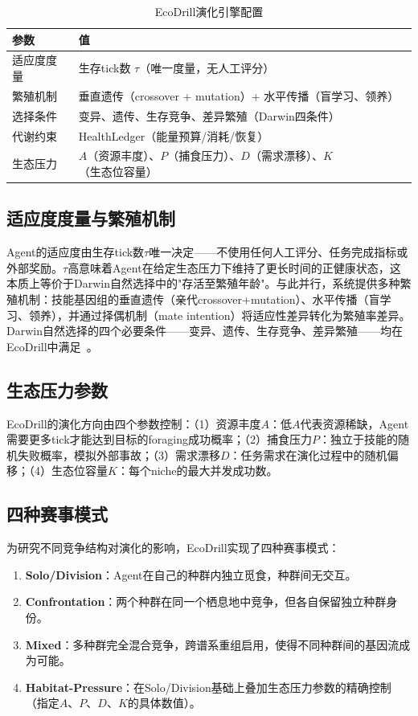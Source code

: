 \documentclass[12pt,a4paper]{ctexart}
\begin{document}
\begin{table}[H]
\centering
\caption{EcoDrill演化引擎配置}
\label{tab:ecodrill_config}
\renewcommand{\arraystretch}{1.1}
\begin{tabular}{ll}
\toprule
参数 & 值 \\
\midrule
适应度度量 & 生存tick数 $\tau$（唯一度量，无人工评分） \\
繁殖机制 & 垂直遗传（crossover + mutation）+ 水平传播（盲学习、领养） \\
选择条件 & 变异、遗传、生存竞争、差异繁殖（Darwin四条件）~\cite{darwin1859} \\
代谢约束 & HealthLedger（能量预算/消耗/恢复） \\
生态压力 & $A$（资源丰度）、$P$（捕食压力）、$D$（需求漂移）、$K$（生态位容量） \\
\bottomrule
\end{tabular}
\end{table}

\subsection{适应度度量与繁殖机制}

Agent的适应度由生存tick数$\tau$唯一决定——不使用任何人工评分、任务完成指标或外部奖励。$\tau$高意味着Agent在给定生态压力下维持了更长时间的正健康状态，这本质上等价于Darwin自然选择中的"存活至繁殖年龄"。与此并行，系统提供多种繁殖机制：技能基因组的垂直遗传（亲代crossover+mutation）、水平传播（盲学习、领养），并通过择偶机制（mate intention）将适应性差异转化为繁殖率差异。Darwin自然选择的四个必要条件——变异、遗传、生存竞争、差异繁殖——均在EcoDrill中满足~\cite{darwin1859,visscher2008heritability,gause1934struggle}。

\subsection{生态压力参数}

EcoDrill的演化方向由四个参数控制：（1）资源丰度$A$：低$A$代表资源稀缺，Agent需要更多tick才能达到目标的foraging成功概率；（2）捕食压力$P$：独立于技能的随机失败概率，模拟外部事故；（3）需求漂移$D$：任务需求在演化过程中的随机偏移；（4）生态位容量$K$：每个niche的最大并发成功数。

\subsection{四种赛事模式}

为研究不同竞争结构对演化的影响，EcoDrill实现了四种赛事模式：
\begin{enumerate}[nosep]
\item \textbf{Solo/Division}：Agent在自己的种群内独立觅食，种群间无交互。
\item \textbf{Confrontation}：两个种群在同一个栖息地中竞争，但各自保留独立种群身份。
\item \textbf{Mixed}：多种群完全混合竞争，跨谱系重组启用，使得不同种群间的基因流成为可能。
\item \textbf{Habitat-Pressure}：在Solo/Division基础上叠加生态压力参数的精确控制（指定$A$、$P$、$D$、$K$的具体数值）。
\end{enumerate}
\end{document}
